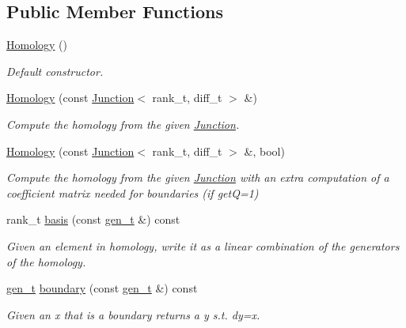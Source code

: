 \subsection*{Public Member Functions}
\begin{DoxyCompactItemize}
\item 
\hyperlink{classMackey_1_1Homology_a3580b194f986bd59a02fb84db97e00f2}{Homology} ()
\begin{DoxyCompactList}\small\item\em Default constructor. \end{DoxyCompactList}\item 
\hyperlink{classMackey_1_1Homology_a31e26f0fb8e1cd7f0506ae1dbc97ea22}{Homology} (const \hyperlink{classMackey_1_1Junction}{Junction}$<$ rank\+\_\+t, diff\+\_\+t $>$ \&)
\begin{DoxyCompactList}\small\item\em Compute the homology from the given \hyperlink{classMackey_1_1Junction}{Junction}. \end{DoxyCompactList}\item 
\hyperlink{classMackey_1_1Homology_af42f480509ef68df47308c0f506d44c8}{Homology} (const \hyperlink{classMackey_1_1Junction}{Junction}$<$ rank\+\_\+t, diff\+\_\+t $>$ \&, bool)
\begin{DoxyCompactList}\small\item\em Compute the homology from the given \hyperlink{classMackey_1_1Junction}{Junction} with an extra computation of a coefficient matrix needed for boundaries (if getQ=1) \end{DoxyCompactList}\item 
rank\+\_\+t \hyperlink{classMackey_1_1Homology_a2e6fb6da3abdba934a1eb2f4236623cb}{basis} (const \hyperlink{classMackey_1_1Homology_adf81f4293a5feba94aa734fcc8c89a46}{gen\+\_\+t} \&) const
\begin{DoxyCompactList}\small\item\em Given an element in homology, write it as a linear combination of the generators of the homology. \end{DoxyCompactList}\item 
\hyperlink{classMackey_1_1Homology_adf81f4293a5feba94aa734fcc8c89a46}{gen\+\_\+t} \hyperlink{classMackey_1_1Homology_aeb3cbf5cc7cb166e8e0a552dda57d05b}{boundary} (const \hyperlink{classMackey_1_1Homology_adf81f4293a5feba94aa734fcc8c89a46}{gen\+\_\+t} \&) const
\begin{DoxyCompactList}\small\item\em Given an x that is a boundary returns a y s.\+t. dy=x. \end{DoxyCompactList}\end{DoxyCompactItemize}
